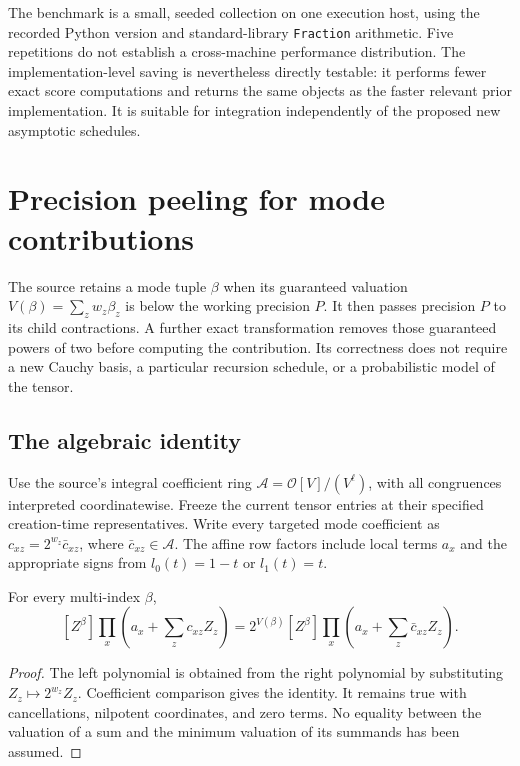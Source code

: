 The benchmark is a small, seeded collection on one execution host, using
the recorded Python version and standard-library \texttt{Fraction}
arithmetic. Five repetitions do not establish a cross-machine performance
distribution. The implementation-level saving is nevertheless directly
testable: it performs fewer exact score computations and returns the same
objects as the faster relevant prior implementation. It is suitable for
integration independently of the proposed new asymptotic schedules.

\section{Precision peeling for mode contributions}
\label{sec:peeling}

The source retains a mode tuple $\beta$ when its guaranteed valuation
$V(\beta)=\sum_z w_z\beta_z$ is below the working precision $P$.
It then passes precision $P$ to its child contractions. A further exact
transformation removes those guaranteed powers of two before computing
the contribution. Its correctness does not require a new Cauchy basis,
a particular recursion schedule, or a probabilistic model of the tensor.

\subsection{The algebraic identity}

Use the source's integral coefficient ring
$\mathcal A=\mathcal O[V]/(V^\ell)$, with all congruences interpreted
coordinatewise. Freeze the current tensor entries at their specified
creation-time representatives. Write every targeted mode coefficient as
$c_{xz}=2^{w_z}\bar c_{xz}$, where $\bar c_{xz}\in\mathcal A$.
The affine row factors include local terms $a_x$ and the appropriate signs
from $l_0(t)=1-t$ or $l_1(t)=t$.

\begin{lemma}\label{lem:normalization}
For every multi-index $\beta$,
\begin{equation}\label{eq:normalization}
 [Z^\beta]\prod_x\left(a_x+\sum_zc_{xz}Z_z\right)
 =2^{V(\beta)}[Z^\beta]
       \prod_x\left(a_x+\sum_z\bar c_{xz}Z_z\right).
\end{equation}
\end{lemma}
\begin{proof}
The left polynomial is obtained from the right polynomial by substituting
$Z_z\mapsto2^{w_z}Z_z$. Coefficient comparison gives the identity. It
remains true with cancellations, nilpotent coordinates, and zero terms.
No equality between the valuation of a sum and the minimum valuation of
its summands has been assumed.
\end{proof}

